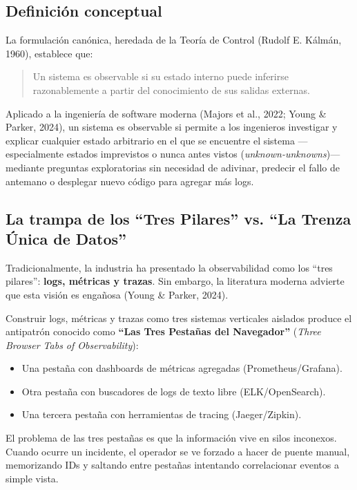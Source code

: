 \documentclass[variant=apuntes,cover=institutional,mode=screen]{ua-engineering-v6-article}
\begin{document}
\subsection{Definición conceptual}

La formulación canónica, heredada de la Teoría de Control (Rudolf E. Kálmán, 1960), establece que:

\begin{quote}
Un sistema es observable si su estado interno puede inferirse razonablemente a partir del conocimiento de sus salidas externas.
\end{quote}

Aplicado a la ingeniería de software moderna (Majors et al., 2022; Young \& Parker, 2024), un sistema es observable si permite a los ingenieros investigar y explicar cualquier estado arbitrario en el que se encuentre el sistema ---especialmente estados imprevistos o nunca antes vistos (\emph{unknown-unknowns})--- mediante preguntas exploratorias sin necesidad de adivinar, predecir el fallo de antemano o desplegar nuevo código para agregar más logs.

\subsection{La trampa de los ``Tres Pilares'' vs. ``La Trenza Única de Datos''}

Tradicionalmente, la industria ha presentado la observabilidad como los ``tres pilares'': \textbf{logs, métricas y trazas}. Sin embargo, la literatura moderna advierte que esta visión es engañosa (Young \& Parker, 2024). 

Construir logs, métricas y trazas como tres sistemas verticales aislados produce el antipatrón conocido como \textbf{``Las Tres Pestañas del Navegador''} (\emph{Three Browser Tabs of Observability}):
\begin{itemize}
\item Una pestaña con dashboards de métricas agregadas (Prometheus/Grafana).
\item Otra pestaña con buscadores de logs de texto libre (ELK/OpenSearch).
\item Una tercera pestaña con herramientas de tracing (Jaeger/Zipkin).
\end{itemize}

El problema de las tres pestañas es que la información vive en silos inconexos. Cuando ocurre un incidente, el operador se ve forzado a hacer de puente manual, memorizando IDs y saltando entre pestañas intentando correlacionar eventos a simple vista.
\end{document}
